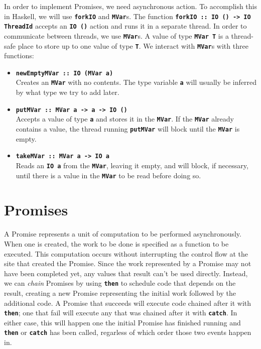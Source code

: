 \documentclass[12pt, english, letterpaper]{kuthesis}
\newcommand{\lit}[1]{\textbf{\texttt{#1}}}
\begin{document}
In order to implement \textsf{Promises}, we need asynchronous action.  To accomplish this in Haskell, we will use \lit{forkIO} and \lit{MVar}s.  The function \lit{forkIO ::\ IO () -> IO ThreadId} accepts an \lit{IO ()} action and runs it in a separate thread.  In order to communicate between threads, we use \lit{MVar}s.  A value of type \lit{MVar T} is a thread-safe place to store up to one value of type \lit T.  We interact with \lit{MVar}s with three functions:
\begin{itemize}
\item \lit{newEmptyMVar ::\ IO (MVar a)} \\
  Creates an \lit{MVar} with no
  contents.  The type variable \lit a will usually be inferred by what
  type we try to add later.
\item \lit{putMVar ::\ MVar a -> a -> IO ()}\\
  Accepts a value of type \lit a and stores it in the \lit{MVar}.  If
  the \lit{MVar} already contains a value, the thread running
  \lit{putMVar} will block until the \lit{MVar} is empty.
\item \lit{takeMVar ::\ MVar a -> IO a} \\
  Reads an \lit{IO a} from the
  \lit{MVar}, leaving it empty, and will block, if necessary, until
  there is a value in the \lit{MVar} to be read before doing so.
\end{itemize}
\section*{Promises}

A \textsf{Promise} represents a unit of computation to be performed asynchronously.  When one is created, the work to be done is specified as a function to be executed.  This computation occurs without interrupting the control flow at the site that created the \textsf{Promise}.  Since the work represented by a \textsf{Promise} may not have been completed yet, any values that result can't be used directly.  Instead, we can \emph{chain} \textsf{Promises} by using \lit{then} to schedule code that depends on the result, creating a new \textsf{Promise} representing the initial work followed by the additional code.  A \textsf{Promise} that succeeds will execute code chained after it with \lit{then}; one that fail will execute any that was chained after it with \lit{catch}.  In either case, this will happen one the initial \textsf{Promise} has finished running and \lit{then} or \lit{catch} has been called, regarless of which order those two events happen in.
\end{document}

